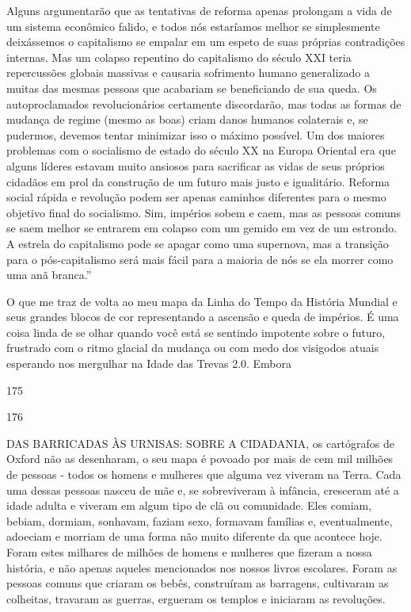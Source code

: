 Alguns argumentarão que as tentativas de reforma apenas prolongam a vida de um sistema econômico falido, e todos nós estaríamos melhor se simplesmente deixássemos o capitalismo se empalar em um espeto de suas próprias contradições internas. Mas um colapso repentino do capitalismo do século XXI teria repercussões globais massivas e causaria sofrimento humano generalizado a muitas das mesmas pessoas que acabariam se beneficiando de sua queda. Os autoproclamados revolucionários certamente discordarão, mas todas as formas de mudança de regime (mesmo as boas) criam danos humanos colaterais e, se pudermos, devemos tentar minimizar isso o máximo possível. Um dos maiores problemas com o socialismo de estado do século XX na Europa Oriental era que alguns líderes estavam muito ansiosos para sacrificar as vidas de seus próprios cidadãos em prol da construção de um futuro mais justo e igualitário. Reforma social rápida e revolução podem ser apenas caminhos diferentes para o mesmo objetivo final do socialismo. Sim, impérios sobem e caem, mas as pessoas comuns se saem melhor se entrarem em colapso com um gemido em vez de um estrondo. A estrela do capitalismo pode se apagar como uma supernova, mas a transição para o pós-capitalismo será mais fácil para a maioria de nós se ela morrer como uma anã branca.”
 \par 
O que me traz de volta ao meu mapa da Linha do Tempo da História Mundial e seus grandes blocos de cor representando a ascensão e queda de impérios. É uma coisa linda de se olhar quando você está se sentindo impotente sobre o futuro, frustrado com o ritmo glacial da mudança ou com medo dos visigodos atuais esperando nos mergulhar na Idade das Trevas {\color{blue}2}.0. Embora
 \par 
175
 \par 
176
 \par 
DAS BARRICADAS ÀS URNISAS: SOBRE A CIDADANIA, os cartógrafos de Oxford não as desenharam, o seu mapa é povoado por mais de cem mil milhões de pessoas - todos os homens e mulheres que alguma vez viveram na Terra. Cada uma dessas pessoas nasceu de mãe e, se sobreviveram à infância, cresceram até a idade adulta e viveram em algum tipo de clã ou comunidade. Eles comiam, bebiam, dormiam, sonhavam, faziam sexo, formavam famílias e, eventualmente, adoeciam e morriam de uma forma não muito diferente da que acontece hoje. Foram estes milhares de milhões de homens e mulheres que fizeram a nossa história, e não apenas aqueles mencionados nos nossos livros escolares. Foram as pessoas comuns que criaram os bebês, construíram as barragens, cultivaram as colheitas, travaram as guerras, ergueram os templos e iniciaram as revoluções.
